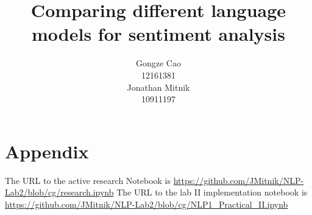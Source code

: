 \documentclass[11pt,a4paper]{article}
\title{Comparing different language models for sentiment analysis}
\author{Gongze Cao \\
  12161381
  \\\And
  Jonathan Mitnik \\
  10911197 \\
}
\date{}
\begin{document}
\maketitle

% 
%


\section{Appendix}
The URL to the active research Notebook is \url{https://github.com/JMitnik/NLP-Lab2/blob/cg/research.ipynb}
The URL to the lab II implementation notebook is \url{https://github.com/JMitnik/NLP-Lab2/blob/cg/NLP1_Practical_II.ipynb}
\end{document}
